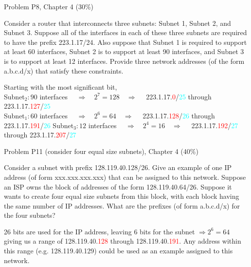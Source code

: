 \documentclass{article}
\begin{document}
\begin{enumerate}
{\begin{enumerate}
    \end{enumerate}}\par
\large{\bfseries \item Problem P8, Chapter 4 (30\%)\par
Consider a router that interconnects three subnets: Subnet 1, Subnet 2, and Subnet 3. Suppose all of the interfaces in each of these three subnets are required to have the prefix 223.1.17/24. Also suppose that Subnet 1 is required to support at least 60 interfaces, Subnet 2 is to support at least 90 interfaces, and Subnet 3 is to support at least 12 interfaces. Provide three network addresses (of the form a.b.c.d/x) that satisfy these constraints.}\par
Starting with the most significant bit,\\
Subnet$_{2}: 90$ interfaces $\quad \Rightarrow \quad2^7=128\quad \Rightarrow \quad$
				223.1.17.\textcolor{Red}{0}/\textcolor{Cyan}{25} through 223.1.17.\textcolor{Red}{127}/\textcolor{Cyan}{25}\\
Subnet$_{1}: 60$ interfaces $\quad \Rightarrow \quad2^6=64\quad \Rightarrow \quad$
				223.1.17.\textcolor{Red}{128}/\textcolor{Cyan}{26} through 223.1.17.\textcolor{Red}{191}/\textcolor{Cyan}{26}
Subnet$_{3}: 12$ interfaces $\quad \Rightarrow \quad2^4=16\quad \Rightarrow \quad$
				223.1.17.\textcolor{Red}{192}/\textcolor{Cyan}{27} through 223.1.17.\textcolor{Red}{207}/\textcolor{Cyan}{27}

\large{\bfseries \item Problem P11 (consider four equal size subnets), Chapter 4 (40\%)\par
Consider a subnet with prefix 128.119.40.128/26. Give an example of one IP address (of form xxx.xxx.xxx.xxx) that can be assigned to this network. Suppose an ISP owns the block of addresses of the form 128.119.40.64/26. Suppose it wants to create four equal size subnets from this block, with each block having the same number of IP addresses. What are the prefixes (of form a.b.c.d/x) for the four subnets?}\par
26 bits are used for the IP address, leaving 6 bits for the subnet $\Rightarrow2^6=64$ giving us a range of 128.119.40.\textcolor{Red}{128} through 128.119.40.\textcolor{Red}{191}. Any address within this range (e.g. 128.119.40.129) could be used as an example assigned to this network.


\end{enumerate}
\end{document}
